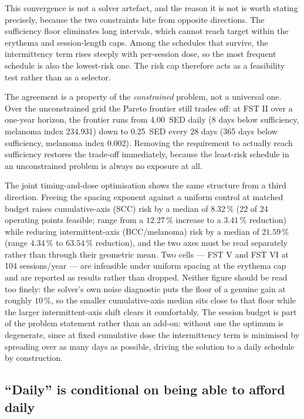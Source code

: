 \documentclass[11pt]{article}
\newcommand{\SED}{SED}
\begin{document}
This convergence is not a solver artefact, and the reason it is not is
worth stating precisely, because the two constraints bite from
opposite directions. The sufficiency floor eliminates long intervals,
which cannot reach target within the erythema and session-length caps.
Among the schedules that survive, the intermittency term rises steeply
with per-session dose, so the most frequent schedule is also the
lowest-risk one. The risk cap therefore acts as a feasibility test
rather than as a selector.

The agreement is a property of the \emph{constrained} problem, not a
universal one. Over the unconstrained grid the Pareto frontier still
trades off: at FST II over a one-year horizon, the frontier runs from
\SI{4.00}{\SED} daily (8 days below sufficiency, melanoma index
234.931) down to \SI{0.25}{\SED} every 28 days (365 days below
sufficiency, melanoma index 0.002). Removing the requirement to
actually reach sufficiency restores the trade-off immediately, because
the least-risk schedule in an unconstrained problem is always no
exposure at all.

The joint timing-and-dose optimisation shows the same structure from a
third direction. Freeing the spacing exponent against a uniform
control at matched budget raises cumulative-axis (SCC) risk by a
median of $8.32\,\%$ (22 of 24 operating points feasible; range from
a $12.27\,\%$ increase to a $3.41\,\%$ reduction) while reducing
intermittent-axis (BCC/melanoma) risk by a median of $21.59\,\%$
(range $4.34\,\%$ to $63.54\,\%$ reduction), and the two axes must be
read separately rather than
through their geometric mean. Two cells --- FST V and FST VI at 104
sessions/year --- are infeasible under uniform spacing at the erythema
cap and are reported as results rather than dropped. Neither figure
should be read too finely: the solver's own noise diagnostic puts the
floor of a genuine gain at roughly $10\,\%$, so the smaller
cumulative-axis median sits close to that floor while the larger
intermittent-axis shift clears it comfortably. The session budget is
part of the problem statement rather than an add-on: without one the
optimum is degenerate, since at fixed cumulative dose the
intermittency term is minimised by spreading over as many days as
possible, driving the solution to a daily schedule by construction.

\subsection{``Daily'' is conditional on being able to afford daily}
\label{sec:budget}
\end{document}
